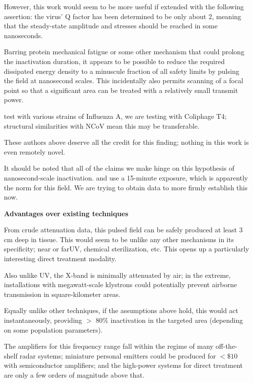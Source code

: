 \documentclass[fleqn,10pt]{paper}
\begin{document}
However, this work would seem to be more useful if extended with the following assertion: the virus' Q factor has been determined to be only about 2, meaning that the steady-state amplitude and stresses should be reached in some nanoseconds.

Barring protein mechanical fatigue \cite{Mechanical2013} or some other mechanism that could prolong the inactivation duration, it appears to be possible to reduce the required dissipated energy density to a minuscule fraction of all safety limits by pulsing the field at nanosecond scales. This incidentally also permits scanning of a focal point so that a significant area can be treated with a relatively small transmit power.

\cite{Efficient2015} test with various strains of Influenza A, we are testing with Coliphage T4; structural similarities with NCoV mean this may be transferable. 

These authors above deserve all the credit for this finding; nothing in this work is even remotely novel.

\begin{autem}
	It should be noted that all of the claims we make hinge on this hypothesis of nanosecond-scale inactivation. \cite{Efficient2015} and \cite{focusing2014} use a 15-minute exposure, which is apparently the norm for this field. We are trying to obtain data to more firmly establish this now.
\end{autem}



{\Large \textbf{Advantages over existing techniques}}

From crude attenuation data, this pulsed field can be safely produced at least 3 cm deep in tissue. This would seem to be unlike any other mechanisms in its specificity; near or far\cite{Germicidal2017}UV, chemical sterilization, etc. This opens up a particularly interesting direct treatment modality.

Also unlike UV, the X-band is minimally attenuated by air; in the extreme, installations with megawatt-scale klystrons could potentially prevent airborne transmission in square-kilometer areas.

Equally unlike other techniques, if the assumptions above hold, this would act instantaneously, providing $>$ 80\% inactivation in the targeted area (depending on some population parameters).

The amplifiers for this frequency range fall within the regime of many off-the-shelf radar systems; miniature personal emitters could be produced for $ < \$10$ with semiconductor amplifiers; and the high-power systems for direct treatment are only a few orders of magnitude above that.
\end{document}
